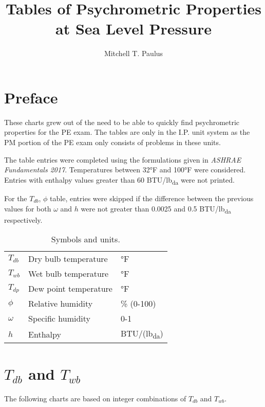 \documentclass{book}
\title{Tables of Psychrometric Properties at Sea Level Pressure}
\author{Mitchell T. Paulus}
\newcommand{\tdb}{\(T_{db}\)}
\newcommand{\twb}{\(T_{wb}\)}
\newcommand{\tdp}{\(T_{dp}\)}
\newcommand{\rh}{\(\phi\)}
\newcommand{\spechum}{\(\omega\)}
\newcommand{\enthalpy}{\(h\)}
\begin{document}

\maketitle{}

\tableofcontents{}

\chapter{Preface}

These charts grew out of the need to be able to quickly find
psychrometric properties for the PE exam. The tables are only in the
I.P. unit system as the PM portion of the PE exam only consists of
problems in these units.

The table entries were completed using the formulations given in
\textit{ASHRAE Fundamentals 2017}. Temperatures between 32°F and 100°F
were considered. Entries with enthalpy values greater than 60
BTU/lb\textsubscript{da}
were not printed.

For the \tdb{}, \rh{} table, entries were skipped if the difference
between the previous values for both \spechum{} and \enthalpy{} were not
greater than 0.0025 and 0.5 BTU/lb\textsubscript{da} respectively.

\begin{table}
\centering
\caption{Symbols and units.}
\label{tab:}
\begin{tabular}{lll}
\toprule
    \tdb & Dry bulb temperature & °F \\
    \twb & Wet bulb temperature & °F \\
    \tdp & Dew point temperature & °F \\
    \rh & Relative humidity & \% (0-100) \\
    \spechum & Specific humidity & 0-1 \\
    \enthalpy & Enthalpy & BTU/(lb\textsubscript{da}) \\
\end{tabular}

\end{table}


\chapter{\(T_{db}\) and \(T_{wb}\) }

The following charts are based on integer combinations of \(T_{db}\) and
\(T_{wb}\).

\newpage
{
\small



}
\end{document}
